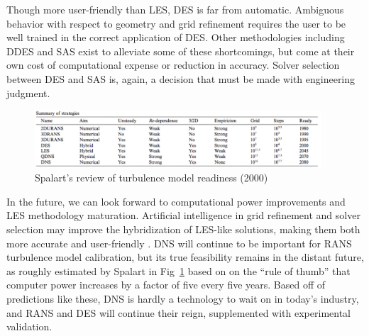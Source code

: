 \documentclass[journal]{new-aiaa}
\begin{document}
Though more user-friendly than LES, DES is far from automatic. Ambiguous behavior with respect to geometry and grid refinement requires the user to be well trained in the correct application of DES. Other methodologies including DDES and SAS exist to alleviate some of these shortcomings, but come at their own cost of computational expense or reduction in accuracy. Solver selection between DES and SAS is, again, a decision that must be made with engineering judgment.

\begin{figure}[H]
\begin{center}
\includegraphics[width=0.95\textwidth]{Images/logan/spalart2000strategies_TurbModelTable.pdf}
\caption{ Spalart's review of turbulence model readiness (2000) \cite{spalart2000strategies} }
\label{fig:turbulencemodelreadiness}
\end{center}
\end{figure}

In the future, we can look forward to computational power improvements and LES methodology maturation. Artificial intelligence in grid refinement and solver selection may improve the hybridization of LES-like solutions, making them both more accurate and user-friendly \cite{spalart2000strategies}. DNS will continue to be important for RANS turbulence model calibration, but its true feasibility remains in the distant future, as roughly estimated by Spalart in Fig~\ref{fig:turbulencemodelreadiness} based on on the ``rule of thumb'' that computer power increases by a factor of five every five years. Based off of predictions like these, DNS is hardly a technology to wait on in today's industry, and RANS and DES will continue their reign, supplemented with experimental validation.
\end{document}
